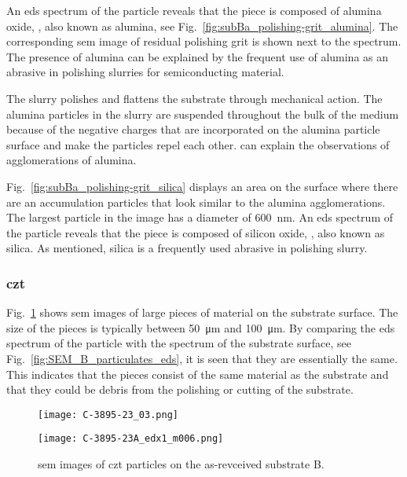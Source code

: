 An \ac{eds} spectrum of the particle reveals that the piece is composed of alumina oxide, , also known as alumina, see Fig.~\ref{fig:subBa_polishing-grit_alumina}. The corresponding \ac{sem} image of residual polishing grit is shown next to the spectrum. The presence of alumina can be explained by the frequent use of alumina as an abrasive in polishing slurries for semiconducting material.

The slurry polishes and flattens the substrate through mechanical action. The alumina particles in the slurry are suspended throughout the bulk of the medium because of the negative charges that are incorporated on the alumina particle surface and make the particles repel each other.  can explain the observations of agglomerations of alumina.

Fig.~\ref{fig:subBa_polishing-grit_silica} displays an area on the surface where there are an accumulation particles that look similar to the alumina agglomerations. The largest particle in the image has a diameter of \SI{600}{\nano\metre}. An \ac{eds} spectrum of the particle reveals that the piece is composed of silicon oxide, , also known as silica. As mentioned, silica is a frequently used abrasive in polishing slurry.

\subsubsection{\Ac{czt}}
Fig.~\ref{fig:SEM_B_particulates} shows \ac{sem} images of large pieces of material on the substrate surface. The size of the pieces is typically between \SI{50}{\micro\metre} and \SI{100}{\micro\metre}. By comparing the \ac{eds} spectrum of the particle with the spectrum of the substrate surface, see Fig.~\ref{fig:SEM_B_particulates_eds}, it is seen that they are essentially the same. This indicates that the pieces consist of the same material as the substrate and that they could be debris from the polishing or cutting of the substrate.

\begin{figure}[htbp]
    \centering
          \begin{minipage}[t]{0.49\linewidth}
            \centering
            \texttt{[image: C-3895-23\_03.png]}
          \end{minipage}
          \hfill
          \begin{minipage}[t]{0.49\linewidth}
            \centering
            \texttt{[image: C-3895-23A\_edx1\_m006.png]}
          \end{minipage}
        \caption[\Ac{sem} images of \ac{czt} particles on as-revceived substrate B.]{\Ac{sem} images of \ac{czt} particles on the as-revceived substrate B.}\label{fig:SEM_B_particulates}  
\end{figure}


